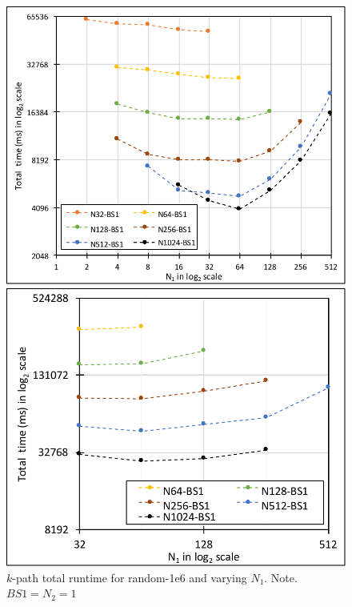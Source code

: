 \begin{figure}[!htb]
    \centering
    \begin{minipage}{0.32\textwidth}
        \centering        
        \includegraphics[width=1\columnwidth]{img/kpath-N1N/fig-perf-kpath-1mil-k6-bs1.pdf}
        \caption{$k$-path total runtime for random-1e6 and varying $N_1$. Note. $BS1=N_2=1$}
        \label{fig:fig-perf-kpath-1mil-k6-bs1.pdf}
    \end{minipage}
    \hspace{0mm}
    \begin{minipage}{0.32\textwidth}
        \centering
        \includegraphics[width=1\columnwidth]{img/kpath-N1N/fig-perf-kpath-orkut-k6-bs1.pdf}

\end{minipage}
\end{figure}
